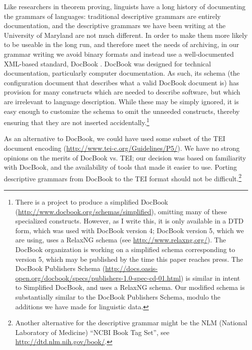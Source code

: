 Like researchers in theorem proving, linguists have a long history of documenting the grammars of languages: traditional descriptive grammars are entirely documentation, and the descriptive grammars we have been writing at the University of Maryland are not much different. In order to make them more likely to be useable in the long run, and therefore meet the needs of archiving, in our grammar writing we avoid binary formats and instead use a well-documented XML-based standard, DocBook \citep{WalshEtAl2011}. DocBook was designed for technical documentation, particularly computer documentation. As such, its schema (the configuration document that describes what a valid DocBook document is) has provision for many constructs which are needed to describe software, but which are irrelevant to language description. While these may be simply ignored, it is easy enough to customize the schema to omit the unneeded constructs, thereby ensuring that they are not inserted accidentally.\footnote{There
  is a project to produce a simplified DocBook (\url{http://www.docbook.org/schemas/simplified}), omitting many of these specialized constructs. However, as I write this, it is only available in a DTD form, which was used with DocBook version 4; DocBook version 5, which we are using, uses a RelaxNG schema (see \url{http://www.relaxng.org/}). The DocBook organization is working on a simplified schema corresponding to version 5, which may be published by the time this paper reaches press. The DocBook Publishers Schema (\url{http://docs.oasis-open.org/docbook/specs/publishers-1.0-spec-cd-01.html}) is similar in intent to Simplified DocBook, and uses a RelaxNG schema. Our modified schema is substantially similar to the DocBook Publishers Schema, modulo the additions we have made for linguistic data.}

As an alternative to DocBook, we could have used some subset of the TEI document encoding (\url{http://www.tei-c.org/Guidelines/P5/}). We have no strong opinions on the merits of DocBook vs. TEI; our decision was based on familiarity with DocBook, and the availability of tools that made it easier to use. Porting descriptive grammars from DocBook to the TEI format should not be difficult.\footnote{Another
  alternative for the descriptive grammar might be the NLM (National Laboratory of Medicine) ``NCBI Book Tag Set'', see \url{http://dtd.nlm.nih.gov/book/}.
}

